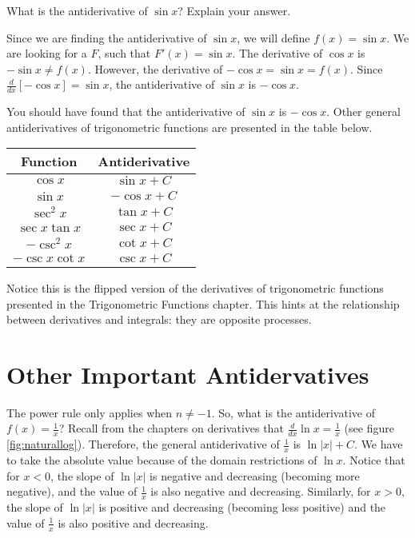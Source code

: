 \begin{Exercise}[label=triganti]
What is the antiderivative of $\sin{x}$? Explain your answer. 
\end{Exercise}

\begin{Answer}[ref=triganti]
Since we are finding the antiderivative of $\sin{x}$, we will define 
$f(x) = \sin{x}$. We are looking for a $F$, such that $F'(x) = \sin{x}$. 
The derivative of $\cos{x}$ is $-\sin{x} \neq f(x)$. However, the derivative 
of $-\cos{x} = \sin{x} = f(x)$. Since $\frac{d}{dx} [-\cos{x}] = 
\sin{x}$, the antiderivative of $\sin{x}$ is $-\cos{x}$. 
\end{Answer}

You should have found that the antiderivative of $\sin{x}$ is 
$-\cos{x}$. Other general antiderivatives of trigonometric functions 
are presented in the table below. 

\begin{center}
	\begin{tabular}{|c|c|}\hline
		Function & Antiderivative\\
		\hline
		$\cos{x}$ & $\sin{x} + C$\\
		\hline
		$\sin{x}$ & $-\cos{x} + C$\\
		\hline
		$\sec^2{x}$ & $\tan{x} + C$\\
		\hline
		$\sec{x} \tan{x}$ & $\sec{x} + C$\\
		\hline
		$-\csc^2{x}$ & $\cot{x} + C$\\
		\hline
		$-\csc{x} \cot{x}$ & $\csc{x} + C$\\
		\hline
	\end{tabular}
\end{center}


Notice this is the flipped version of the derivatives of trigonometric 
functions presented in the Trigonometric Functions chapter. This hints 
at the relationship between derivatives and integrals: they are 
opposite processes. 

\section{Other Important Antidervatives}

The power rule only applies when $n\neq-1$. So, what is the 
antiderivative of $f(x) = \frac{1}{x}$? Recall from the chapters on 
derivatives that $\frac{d}{dx} \ln{x} = \frac{1}{x}$ (see figure 
\ref{fig:naturallog}). Therefore, the general antiderivative of 
$\frac{1}{x}$ is $\ln{|x|} + C$. We have to take the absolute value 
because of the domain restrictions of $\ln{x}$. Notice that for $x<0$, 
the slope of $\ln{|x|}$ is negative and decreasing (becoming more 
negative), and the value of $\frac{1}{x}$ is also negative and 
decreasing. Similarly, for $x>0$, the slope of $\ln{|x|}$ is positive 
and decreasing (becoming less positive) and the value of $\frac{1}{x}$ 
is also positive and decreasing. 

